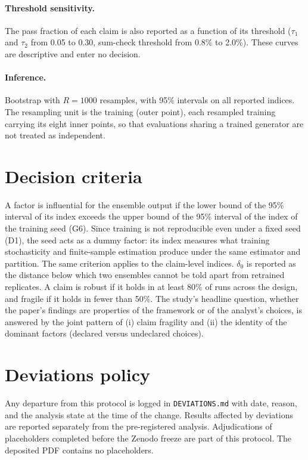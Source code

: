 \documentclass[11pt,a4paper]{article}
\newcommand{\prop}[1]{#1}
\newcommand{\prop}[1]{\textcolor{blue}{#1}}
\begin{document}
\paragraph{Threshold sensitivity.} \prop{The pass fraction of each claim is
also reported as a function of its threshold ($\tau_1$ and $\tau_2$ from
0.05 to 0.30, sum-check threshold from 0.8\% to 2.0\%). These curves are
descriptive and enter no decision.}

\paragraph{Inference.} Bootstrap with $R=1000$ resamples, with 95\%
intervals on all reported indices. \prop{The resampling unit is the
training (outer point), each resampled training carrying its eight inner
points, so that evaluations sharing a trained generator are not treated as
independent.}

\section{Decision criteria}\label{sec:criteria}
\prop{A factor is influential for the ensemble output if the lower bound of
the 95\% interval of its index exceeds the upper bound of the 95\% interval
of the index of the training seed (G6). Since training is not reproducible
even under a fixed seed (D1), the seed acts as a dummy factor: its index
measures what training stochasticity and finite-sample estimation produce
under the same estimator and partition. The same criterion applies to the
claim-level indices. $\delta_0$ is reported as the distance below which two
ensembles cannot be told apart from retrained replicates.} A claim is
robust if it holds in at least 80\% of runs across the design, and fragile
if it holds in fewer than 50\%. The study's headline question, whether the
paper's findings are properties of the framework or of the analyst's
choices, is answered by the joint pattern of (i) claim fragility and (ii)
the identity of the dominant factors (declared versus undeclared choices).

\section{Deviations policy}\label{sec:deviations}
Any departure from this protocol is logged in \texttt{DEVIATIONS.md} with
date, reason, and the analysis state at the time of the change. Results
affected by deviations are reported separately from the pre-registered
analysis. Adjudications of placeholders completed before the Zenodo freeze
are part of this protocol. The deposited PDF contains no placeholders.
\end{document}
